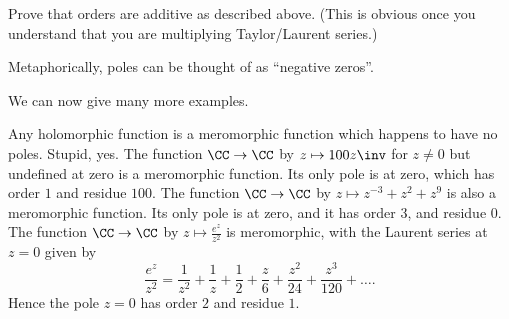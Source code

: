 \begin{ques}
	Prove that orders are additive as described above.
	(This is obvious once you understand that you are multiplying Taylor/Laurent series.)
\end{ques}

Metaphorically, poles can be thought of as ``negative zeros''.


We can now give many more examples.
\begin{example}
	\listhack
	\begin{enumerate}[(a)]
		\ii Any holomorphic function is a meromorphic function which happens to have no poles.
		Stupid, yes.
		\ii The function $\CC \to \CC$ by $z \mapsto 100z\inv$ for $z \neq 0$
		but undefined at zero is a meromorphic function.
		Its only pole is at zero, which has order $1$ and residue $100$.
		\ii The function $\CC \to \CC$ by $z \mapsto z^{-3} + z^2 + z^9$ is also a meromorphic function.
		Its only pole is at zero, and it has order $3$, and residue $0$.
		\ii The function $\CC \to \CC$ by $z \mapsto \frac{e^z}{z^2}$ is meromorphic,
		with the Laurent series at $z=0$ given by
		\[
			\frac{e^z}{z^2}
			= \frac{1}{z^2} + \frac{1}{z} + \frac{1}{2} + \frac{z}{6} + \frac{z^2}{24} + \frac{z^3}{120}
			+ \dots.
		\]
		Hence the pole $z=0$ has order $2$ and residue $1$.
	\end{enumerate}
\end{example}

